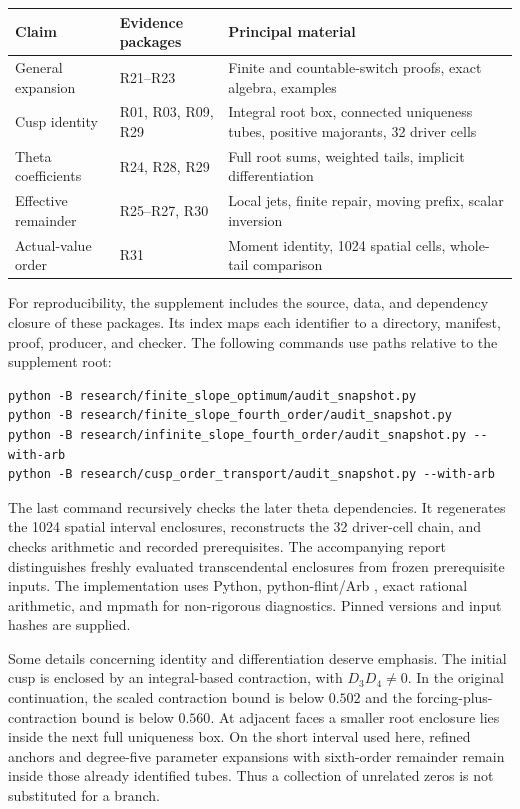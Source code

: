 \begin{center}\small
\begin{tabular}{p{.20\linewidth}p{.18\linewidth}p{.52\linewidth}}
\toprule
Claim & Evidence packages & Principal material\\
\midrule
General expansion & R21--R23 &
Finite and countable-switch proofs, exact algebra, examples\\
Cusp identity & R01, R03, R09, R29 &
Integral root box, connected uniqueness tubes, positive majorants,
32 driver cells\\
Theta coefficients & R24, R28, R29 &
Full root sums, weighted tails, implicit differentiation\\
Effective remainder & R25--R27, R30 &
Local jets, finite repair, moving prefix, scalar inversion\\
Actual-value order & R31 &
Moment identity, 1024 spatial cells, whole-tail comparison\\
\bottomrule
\end{tabular}
\end{center}

For reproducibility, the supplement includes the source, data, and dependency
closure of these packages. Its index maps each identifier to a directory,
manifest, proof, producer, and checker.
The following commands use paths relative to the supplement root:
\begin{verbatim}
python -B research/finite_slope_optimum/audit_snapshot.py
python -B research/finite_slope_fourth_order/audit_snapshot.py
python -B research/infinite_slope_fourth_order/audit_snapshot.py --with-arb
python -B research/cusp_order_transport/audit_snapshot.py --with-arb
\end{verbatim}
The last command recursively checks the later theta dependencies.
It regenerates the 1024 spatial interval enclosures, reconstructs the
32 driver-cell chain, and checks arithmetic and recorded prerequisites.
The accompanying report distinguishes freshly evaluated transcendental
enclosures from frozen prerequisite inputs.
The implementation uses Python, python-flint/Arb \cite{arb,integration},
exact rational arithmetic, and mpmath for non-rigorous diagnostics.
Pinned versions and input hashes are supplied.

Some details concerning identity and differentiation deserve emphasis.
The initial cusp is enclosed by an integral-based contraction, with
\(D_3D_4\ne0\). In the original continuation, the scaled contraction
bound is below \(0.502\) and the forcing-plus-contraction bound
is below \(0.560\).
At adjacent faces a smaller root enclosure lies inside the next full
uniqueness box. On the short interval used here, refined anchors and
degree-five parameter expansions with sixth-order remainder remain
inside those already identified tubes.
Thus a collection of unrelated zeros is not substituted for a branch.

